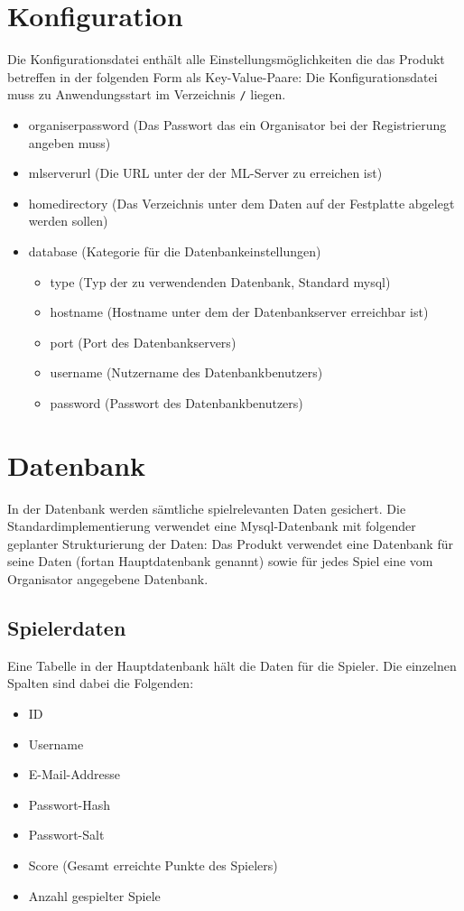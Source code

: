 \documentclass[a4paper]{scrreprt}
\begin{document}
	\section{Konfiguration}
	Die Konfigurationsdatei enthält alle Einstellungsmöglichkeiten die das Produkt betreffen in der folgenden Form als Key-Value-Paare:
	Die Konfigurationsdatei muss zu Anwendungsstart im Verzeichnis \texttt{/} liegen. %
	\begin{itemize}
		\item organiserpassword (Das Passwort das ein Organisator bei der Registrierung angeben muss)
		\item mlserverurl       (Die URL unter der der ML-Server zu erreichen ist)
		\item homedirectory     (Das Verzeichnis unter dem Daten auf der Festplatte abgelegt werden sollen)
		\item database          (Kategorie für die Datenbankeinstellungen)
		\begin{itemize}
			\item type          (Typ der zu verwendenden Datenbank, Standard mysql)
			\item hostname      (Hostname unter dem der Datenbankserver erreichbar ist)
			\item port          (Port des Datenbankservers)
			\item username      (Nutzername des Datenbankbenutzers)
			\item password      (Passwort des Datenbankbenutzers)
		\end{itemize}
	\end{itemize}
	\section{Datenbank}
	In der Datenbank werden sämtliche spielrelevanten Daten gesichert.
	Die Standardimplementierung verwendet eine Mysql-Datenbank mit folgender geplanter Strukturierung der Daten:
	Das Produkt verwendet eine Datenbank für seine Daten (fortan Hauptdatenbank genannt) sowie für jedes Spiel eine vom Organisator angegebene Datenbank.
	\subsection{Spielerdaten}
	Eine Tabelle in der Hauptdatenbank hält die Daten für die Spieler.
	Die einzelnen Spalten sind dabei die Folgenden:
	\begin{itemize}
		\item ID
		\item Username
		\item E-Mail-Addresse
		\item Passwort-Hash
		\item Passwort-Salt
		\item Score (Gesamt erreichte Punkte des Spielers)
		\item Anzahl gespielter Spiele
	\end{itemize}
\end{document}

